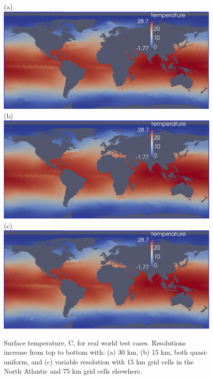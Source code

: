 \begin{figure}[H!]
	\centering
(a)\includegraphics[scale=0.36]{ocean/figures/m72s_30km_yr11_k1_T.png}\\
(b)\includegraphics[scale=0.36]{ocean/figures/m72r_15km_yr2_k1_T.png}\\
(c)\includegraphics[scale=0.36]{ocean/figures/m72t_NA_15km_yr11_k1_T.png}
\caption{Surface temperature, C, for real world test cases.  Resolutions increase from top to bottom with: (a) 30 km, (b) 15 km, both quasi-uniform, and (c) variable resolution with 15 km grid cells in the North Atlantic and 75 km grid cells elsewhere. }
	\label{fig:real_world_T2}
\end{figure}

